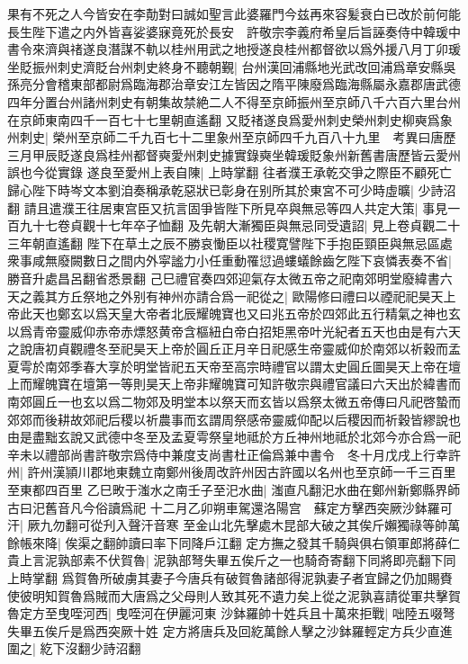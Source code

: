 果有不死之人今皆安在李勣對曰誠如聖言此婆羅門今兹再來容髪衰白已改於前何能長生陛下遣之内外皆喜娑婆寐竟死於長安　許敬宗李義府希皇后旨誣奏侍中韓瑗中書令來濟與禇遂良潛謀不軌以桂州用武之地授遂良桂州都督欲以爲外援八月丁卯瑗坐貶振州刺史濟貶台州刺史終身不聽朝覲|{
	台州漢回浦縣地光武改回浦爲章安縣吳孫亮分會稽東部都尉爲臨海郡治章安江左皆因之隋平陳廢爲臨海縣屬永嘉郡唐武德四年分置台州諸州刺史有朝集故禁絶二人不得至京師振州至京師八千六百六里台州在京師東南四千一百七十七里朝直遙翻}
又貶禇遂良爲愛州刺史榮州刺史柳奭爲象州刺史|{
	榮州至京師二千九百七十二里象州至京師四千九百八十九里　考異曰唐歷三月甲辰貶遂良爲桂州都督奭愛州刺史據實錄奭坐韓瑗貶象州新舊書唐歷皆云愛州誤也今從實錄}
遂良至愛州上表自陳|{
	上時掌翻}
往者濮王承乾交爭之際臣不顧死亡歸心陛下時岑文本劉洎奏稱承乾惡狀已彰身在别所其於東宮不可少時虛曠|{
	少詩沼翻}
請且遣濮王往居東宫臣又抗言固爭皆陛下所見卒與無忌等四人共定大策|{
	事見一百九十七卷貞觀十七年卒子恤翻}
及先朝大漸獨臣與無忌同受遺詔|{
	見上卷貞觀二十三年朝直遙翻}
陛下在草土之辰不勝哀慟臣以社稷寛譬陛下手抱臣頸臣與無忌區處衆事咸無廢闕數日之間内外寜謐力小任重動罹愆過螻蟻餘齒乞陛下哀憐表奏不省|{
	勝音升處昌呂翻省悉景翻}
己巳禮官奏四郊迎氣存太微五帝之祀南郊明堂廢緯書六天之義其方丘祭地之外别有神州亦請合爲一祀從之|{
	歐陽修曰禮曰以禋祀祀昊天上帝此天也鄭玄以爲天皇大帝者北辰耀魄寶也又曰兆五帝於四郊此五行精氣之神也玄以爲青帝靈威仰赤帝赤熛怒黄帝含樞紐白帝白招矩黑帝叶光紀者五天也由是有六天之說唐初貞觀禮冬至祀昊天上帝於圓丘正月辛日祀感生帝靈威仰於南郊以祈穀而孟夏雩於南郊季春大享於明堂皆祀五天帝至高宗時禮官以謂太史圓丘圖昊天上帝在壇上而耀魄寶在壇第一等則昊天上帝非耀魄寶可知許敬宗與禮官議曰六天出於緯書而南郊圓丘一也玄以爲二物郊及明堂本以祭天而玄皆以爲祭太微五帝傳曰凡祀啓蟄而郊郊而後耕故郊祀后稷以祈農事而玄謂周祭感帝靈威仰配以后稷因而祈穀皆繆說也由是盡黜玄說又武德中冬至及孟夏雩祭皇地祗於方丘神州地祗於北郊今亦合爲一祀}
辛未以禮部尚書許敬宗爲侍中兼度支尚書杜正倫爲兼中書令　冬十月戊戌上行幸許州|{
	許州漢頴川郡地東魏立南鄭州後周改許州因古許國以名州也至京師一千三百里至東都四百里}
乙巳畋于滍水之南壬子至汜水曲|{
	滍直凡翻汜水曲在鄭州新鄭縣界師古曰汜舊音凡今俗讀爲祀}
十二月乙卯朔車駕還洛陽宫　蘇定方擊西突厥沙鉢羅可汗|{
	厥九勿翻可從刋入聲汗音寒}
至金山北先擊處木昆部大破之其俟斤嬾獨祿等帥萬餘帳來降|{
	俟渠之翻帥讀曰率下同降戶江翻}
定方撫之發其千騎與俱右領軍郎將薛仁貴上言泥孰部素不伏賀魯|{
	泥孰部弩失畢五俟斤之一也騎奇寄翻下同將即亮翻下同上時掌翻}
爲賀魯所破虜其妻子今唐兵有破賀魯諸部得泥孰妻子者宜歸之仍加賜賚使彼明知賀魯爲賊而大唐爲之父母則人致其死不遺力矣上從之泥孰喜請從軍共擊賀魯定方至曳咥河西|{
	曳咥河在伊麗河東}
沙鉢羅帥十姓兵且十萬來拒戰|{
	咄陸五啜弩失畢五俟斤是爲西突厥十姓}
定方將唐兵及回紇萬餘人擊之沙鉢羅輕定方兵少直進圍之|{
	紇下沒翻少詩沼翻}
